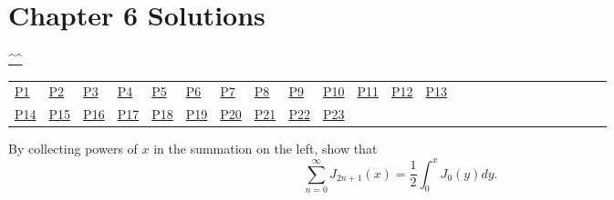 \section{Chapter 6 Solutions}
\begin{center}\hyperref[toc]{\^{}\^{}}\end{center}
\begin{center}\begin{tabular}{lllllllllllllllllllllllll}
\hyperref[problem1chapter6]{P1} & \hyperref[problem2chapter6]{P2} & \hyperref[problem3chapter6]{P3} & \hyperref[problem4chapter6]{P4} & \hyperref[problem5chapter6]{P5} & \hyperref[problem6chapter6]{P6} & \hyperref[problem7chapter6]{P7} & \hyperref[problem8chapter6]{P8} & \hyperref[problem9chapter6]{P9} & \hyperref[problem10chapter6]{P10} & \hyperref[problem11chapter6]{P11} & \hyperref[problem12chapter6]{P12} & \hyperref[problem13chapter6]{P13} \\
\hyperref[problem14chapter6]{P14} & \hyperref[problem15chapter6]{P15} & \hyperref[problem16chapter6]{P16} & \hyperref[problem17chapter6]{P17} & \hyperref[problem18chapter6]{P18} & \hyperref[problem19chapter6]{P19} & \hyperref[problem20chapter6]{P20} & \hyperref[problem21chapter6]{P21} & \hyperref[problem22chapter6]{P22} & \hyperref[problem23chapter6]{P23} 
\end{tabular}\end{center}
\setcounter{problem}{0}
\setcounter{solution}{0}
\begin{problem}\label{problem1chapter6}
By collecting powers of $x$ in the summation on the left, show that
$$\displaystyle\sum_{n=0}^{\infty} J_{2n+1}(x) = \dfrac{1}{2} \displaystyle\int_0^x J_0(y) dy.$$
\end{problem}
